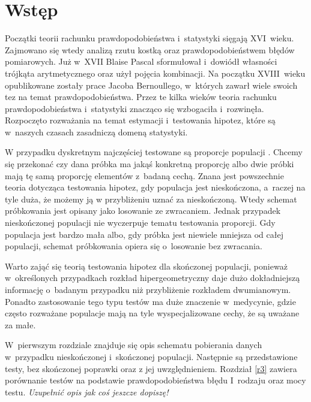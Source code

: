 \chapter*{Wstęp}
Początki teorii rachunku prawdopodobieństwa i~statystyki sięgają XVI~wieku. Zajmowano się wtedy analizą rzutu kostką oraz prawdopodobieństwem błędów pomiarowych. Już w~XVII Blaise Pascal sformułował i~dowiódł własności trójkąta arytmetycznego oraz użył pojęcia kombinacji. Na początku XVIII~wieku opublikowane zostały prace Jacoba Bernoullego, w~których zawarł wiele swoich tez na temat prawdopodobieństwa. Przez te kilka wieków teoria rachunku prawdopodobieństwa i~statystyki znacząco się wzbogaciła i~rozwinęła. Rozpoczęto rozważania na temat estymacji i~testowania hipotez, które są w~naszych czasach zasadniczą domeną statystyki.

W przypadku dyskretnym najczęściej testowane są proporcje populacji \cite{Lehmann1968}. Chcemy się przekonać czy dana próbka ma jakąś konkretną proporcję albo dwie próbki mają tę samą proporcję elementów z~badaną cechą. Znana jest powszechnie teoria dotycząca testowania hipotez, gdy populacja jest nieskończona, a~raczej na tyle duża, że możemy ją w przybliżeniu uznać za nieskończoną. Wtedy schemat próbkowania \cite{Edgeworth1918} jest opisany jako losowanie ze zwracaniem. Jednak przypadek nieskończonej populacji nie wyczerpuje tematu testowania proporcji. Gdy populacja jest bardzo mała albo, gdy próbka jest niewiele mniejsza od całej populacji, schemat próbkowania opiera się o~losowanie bez zwracania. 

Warto zająć się teorią testowania hipotez dla skończonej populacji, ponieważ w~określonych przypadkach rozkład hipergeometryczny daje dużo dokładniejszą informację o~badanym przypadku niż przybliżenie rozkładem dwumianowym. Ponadto zastosowanie tego typu testów ma duże znaczenie w~medycynie, gdzie często rozważane populacje mają na tyle wyspecjalizowane cechy, że są uważane za małe.

W~pierwszym rozdziale znajduje się opis schematu pobierania danych w~przypadku nieskończonej i~skończonej populacji. Następnie są przedstawione testy, bez skończonej poprawki oraz z jej uwzględnieniem. Rozdział \ref{r3} zawiera porównanie testów na podstawie prawdopodobieństwa błędu I~rodzaju oraz mocy testu. \textit{Uzupełnić opis jak coś jeszcze dopiszę!}
